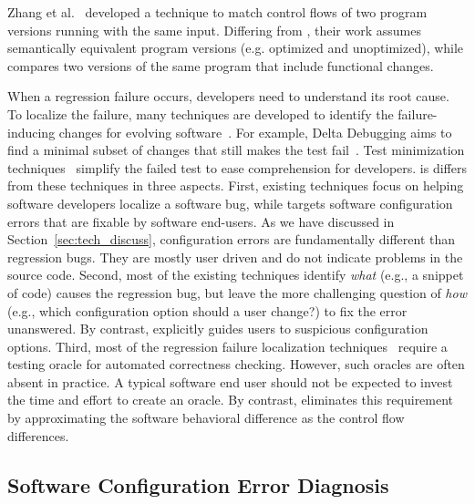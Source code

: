Zhang et al.~\cite{Zhang:2005:MEH} developed a technique to match
control flows of two program versions running with
the same input. Differing from \ourtool, their
work assumes semantically equivalent program versions (e.g. optimized
and unoptimized), while \ourtool compares two versions
of the same program that include functional changes. 

When a regression failure occurs, developers need
to understand its root cause. To localize the
failure, many techniques are developed to identify the
failure-inducing changes for evolving
software~\cite{Banerjee:2010:GID, r2fix, Qi:2009:DAD, Hoffman:2009:STA}.
For example, Delta Debugging aims to find a minimal
subset of changes that still makes the test fail~\cite{dd}.
Test minimization techniques~\cite{Hoffman:2009:STA, Zhang:2013:PST}
simplify the failed
test to ease comprehension for developers. 
\ourtool is differs from these techniques in three aspects.
First, existing techniques focus on helping software developers
localize a software bug, while \ourtool targets software
configuration errors that are fixable by software end-users.
As we have discussed in Section~\ref{sec:tech_discuss},
configuration errors are fundamentally different than regression bugs.
They are mostly user driven and do not indicate problems in the source
code. Second, most of the existing techniques identify
\textit{what} (e.g., a snippet of code) causes the
regression bug, but leave
the more challenging question of \textit{how} (e.g., which
configuration option should a user change?) to
fix the error unanswered. By contrast, \ourtool
explicitly guides users to suspicious configuration options.
Third, most of the regression failure localization
techniques~\cite{dd} require 
a testing oracle for automated correctness checking. However,
such oracles are often absent in practice. A typical
software end user should not be expected to invest
the time and effort to create an oracle.
By contrast, \ourtool eliminates this requirement by
approximating the software behavioral difference as the control
flow differences.


\subsection{Software Configuration Error Diagnosis}

